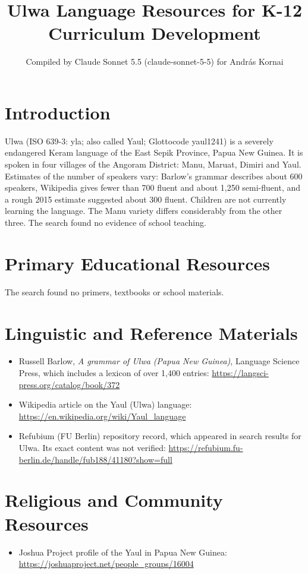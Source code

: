 \documentclass[12pt]{article}
\title{Ulwa Language Resources for K-12 Curriculum Development}
\author{Compiled by Claude Sonnet 5.5 (claude-sonnet-5-5) for Andr\'as Kornai}
\date{}
\begin{document}
\maketitle

\section{Introduction}
Ulwa (ISO 639-3: yla; also called Yaul; Glottocode yaul1241) is a severely endangered Keram language of the East Sepik Province, Papua New Guinea. It is spoken in four villages of the Angoram District: Manu, Maruat, Dimiri and Yaul. Estimates of the number of speakers vary: Barlow's grammar describes about 600 speakers, Wikipedia gives fewer than 700 fluent and about 1,250 semi-fluent, and a rough 2015 estimate suggested about 300 fluent. Children are not currently learning the language. The Manu variety differs considerably from the other three. The search found no evidence of school teaching.

\section{Primary Educational Resources}
The search found no primers, textbooks or school materials.

\section{Linguistic and Reference Materials}
\begin{itemize}
\item Russell Barlow, \emph{A grammar of Ulwa (Papua New Guinea)}, Language Science Press, which includes a lexicon of over 1,400 entries: \url{https://langsci-press.org/catalog/book/372}
\item Wikipedia article on the Yaul (Ulwa) language: \url{https://en.wikipedia.org/wiki/Yaul_language}
\item Refubium (FU Berlin) repository record, which appeared in search results for Ulwa. Its exact content was not verified: \url{https://refubium.fu-berlin.de/handle/fub188/41180?show=full}
\end{itemize}

\section{Religious and Community Resources}
\begin{itemize}
\item Joshua Project profile of the Yaul in Papua New Guinea: \url{https://joshuaproject.net/people_groups/16004}
\end{itemize}
\end{document}
